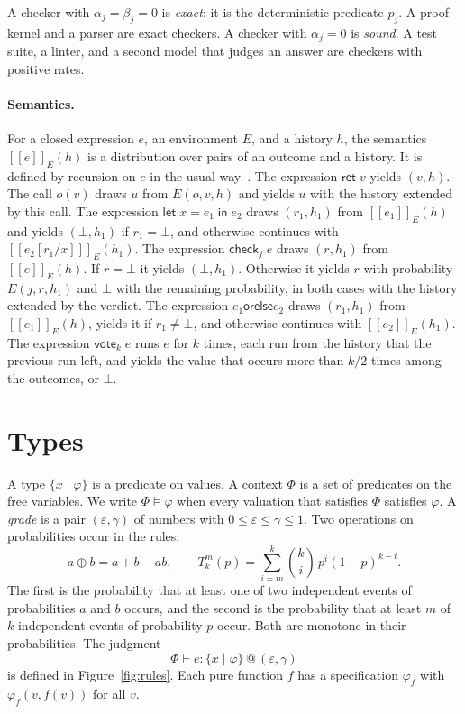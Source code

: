 \documentclass[acmsmall,nonacm,screen]{acmart}
\makeatletter
\newcommand{\kw}[1]{\mathsf{#1}}
\newcommand{\ret}{\kw{ret}}
\newcommand{\letin}[3]{\kw{let}\;#1 = #2\;\kw{in}\;#3}
\newcommand{\chk}[2]{\kw{check}_{#1}\;#2}
\newcommand{\vote}[2]{\kw{vote}_{#1}\;#2}
\newcommand{\orelse}{\mathbin{\kw{orelse}}}
\newcommand{\rty}[2]{\{#1 \mid #2\}}
\newcommand{\at}[2]{\mathrel{@}(#1, #2)}
\newcommand{\sem}[1]{[\![#1]\!]}
\newcommand{\tl}[3]{T_{#1}^{#2}(#3)}
\makeatother
\begin{document}
A checker with $\alpha_j = \beta_j = 0$ is \emph{exact}: it is the deterministic predicate
$p_j$. A proof kernel and a parser are exact checkers. A checker with $\alpha_j = 0$ is
\emph{sound}. A test suite, a linter, and a second model that judges an answer are checkers
with positive rates.

\paragraph{Semantics.}
For a closed expression $e$, an environment $E$, and a history $h$, the semantics
$\sem{e}_E(h)$ is a distribution over pairs of an outcome and a history. It is defined by
recursion on $e$ in the usual way~\citep{kozen1981}. The expression $\ret\;v$ yields $(v, h)$.
The call $o(v)$ draws $u$ from $E(o, v, h)$ and yields $u$ with the history extended by this
call. The expression $\letin{x}{e_1}{e_2}$ draws $(r_1, h_1)$ from $\sem{e_1}_E(h)$ and yields
$(\bot, h_1)$ if $r_1 = \bot$, and otherwise continues with $\sem{e_2[r_1/x]}_E(h_1)$. The
expression $\chk{j}{e}$ draws $(r, h_1)$ from $\sem{e}_E(h)$. If $r = \bot$ it yields
$(\bot, h_1)$. Otherwise it yields $r$ with probability $E(j, r, h_1)$ and $\bot$ with the
remaining probability, in both cases with the history extended by the verdict. The expression
$e_1 \orelse e_2$ draws $(r_1, h_1)$ from $\sem{e_1}_E(h)$, yields it if $r_1 \neq \bot$, and
otherwise continues with $\sem{e_2}_E(h_1)$. The expression $\vote{k}{e}$ runs $e$ for $k$
times, each run from the history that the previous run left, and yields the value that occurs
more than $k/2$ times among the outcomes, or $\bot$.

\section{Types}
\label{sec:types}

A type $\rty{x}{\varphi}$ is a predicate on values. A context $\Phi$ is a set of predicates on
the free variables. We write $\Phi \models \varphi$ when every valuation that satisfies $\Phi$
satisfies $\varphi$. A \emph{grade} is a pair $(\varepsilon, \gamma)$ of numbers with
$0 \le \varepsilon \le \gamma \le 1$. Two operations on probabilities occur in the rules:
\[
a \oplus b = a + b - ab, \qquad
\tl{k}{m}{p} = \sum_{i=m}^{k} \binom{k}{i}\, p^i (1-p)^{k-i} .
\]
The first is the probability that at least one of two independent events of probabilities $a$
and $b$ occurs, and the second is the probability that at least $m$ of $k$ independent events
of probability $p$ occur. Both are monotone in their probabilities. The judgment
\[
\Phi \vdash e : \rty{x}{\varphi} \at{\varepsilon}{\gamma}
\]
is defined in Figure~\ref{fig:rules}. Each pure function $f$ has a specification $\varphi_f$
with $\varphi_f(v, f(v))$ for all $v$.
\end{document}
